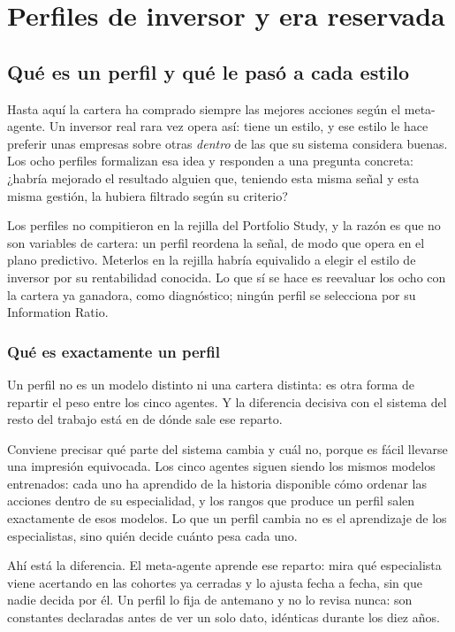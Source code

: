 \section{Perfiles de inversor y era reservada}
\label{sec:perfiles}

\subsection{Qué es un perfil y qué le pasó a cada estilo}

Hasta aquí la cartera ha comprado siempre las mejores acciones según el meta-agente. Un inversor
real rara vez opera así: tiene un estilo, y ese estilo le hace preferir unas empresas sobre otras
\emph{dentro} de las que su sistema considera buenas. Los ocho perfiles formalizan esa idea y
responden a una pregunta concreta: ¿habría mejorado el resultado alguien que, teniendo esta misma
señal y esta misma gestión, la hubiera filtrado según su criterio?

Los perfiles no compitieron en la rejilla del Portfolio Study, y la razón es que no son variables de
cartera: un perfil reordena la señal, de modo que opera en el plano predictivo. Meterlos en la
rejilla habría equivalido a elegir el estilo de inversor por su rentabilidad conocida. Lo que sí se
hace es reevaluar los ocho con la cartera ya ganadora, como diagnóstico; ningún perfil se
selecciona por su Information Ratio.

\subsubsection*{Qué es exactamente un perfil}

Un perfil no es un modelo distinto ni una cartera distinta: es otra forma de repartir el peso entre
los cinco agentes. Y la diferencia decisiva con el sistema del resto del trabajo está en de dónde
sale ese reparto.

Conviene precisar qué parte del sistema cambia y cuál no, porque es fácil llevarse una impresión
equivocada. Los cinco agentes siguen siendo los mismos modelos entrenados: cada uno ha
aprendido de la historia disponible cómo ordenar las acciones dentro de su especialidad, y los rangos
que produce un perfil salen exactamente de esos modelos. Lo que un perfil cambia no es el aprendizaje
de los especialistas, sino quién decide cuánto pesa cada uno.

Ahí está la diferencia. El meta-agente aprende ese reparto: mira qué especialista viene
acertando en las cohortes ya cerradas y lo ajusta fecha a fecha, sin que nadie decida por él. Un
perfil lo fija de antemano y no lo revisa nunca: son constantes declaradas antes de ver un solo dato,
idénticas durante los diez años.

